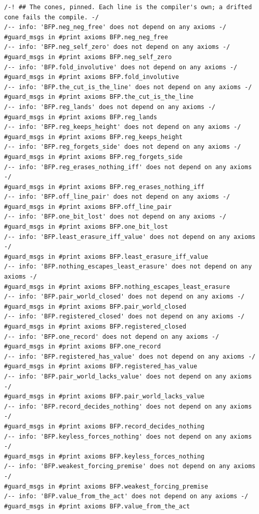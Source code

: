 \documentclass[10pt,twocolumn]{article}
\begin{document}
\begin{Verbatim}
/-! ## The cones, pinned. Each line is the compiler's own; a drifted cone fails the compile. -/
/-- info: 'BFP.neg_neg_free' does not depend on any axioms -/
#guard_msgs in #print axioms BFP.neg_neg_free
/-- info: 'BFP.neg_self_zero' does not depend on any axioms -/
#guard_msgs in #print axioms BFP.neg_self_zero
/-- info: 'BFP.fold_involutive' does not depend on any axioms -/
#guard_msgs in #print axioms BFP.fold_involutive
/-- info: 'BFP.the_cut_is_the_line' does not depend on any axioms -/
#guard_msgs in #print axioms BFP.the_cut_is_the_line
/-- info: 'BFP.reg_lands' does not depend on any axioms -/
#guard_msgs in #print axioms BFP.reg_lands
/-- info: 'BFP.reg_keeps_height' does not depend on any axioms -/
#guard_msgs in #print axioms BFP.reg_keeps_height
/-- info: 'BFP.reg_forgets_side' does not depend on any axioms -/
#guard_msgs in #print axioms BFP.reg_forgets_side
/-- info: 'BFP.reg_erases_nothing_iff' does not depend on any axioms -/
#guard_msgs in #print axioms BFP.reg_erases_nothing_iff
/-- info: 'BFP.off_line_pair' does not depend on any axioms -/
#guard_msgs in #print axioms BFP.off_line_pair
/-- info: 'BFP.one_bit_lost' does not depend on any axioms -/
#guard_msgs in #print axioms BFP.one_bit_lost
/-- info: 'BFP.least_erasure_iff_value' does not depend on any axioms -/
#guard_msgs in #print axioms BFP.least_erasure_iff_value
/-- info: 'BFP.nothing_escapes_least_erasure' does not depend on any axioms -/
#guard_msgs in #print axioms BFP.nothing_escapes_least_erasure
/-- info: 'BFP.pair_world_closed' does not depend on any axioms -/
#guard_msgs in #print axioms BFP.pair_world_closed
/-- info: 'BFP.registered_closed' does not depend on any axioms -/
#guard_msgs in #print axioms BFP.registered_closed
/-- info: 'BFP.one_record' does not depend on any axioms -/
#guard_msgs in #print axioms BFP.one_record
/-- info: 'BFP.registered_has_value' does not depend on any axioms -/
#guard_msgs in #print axioms BFP.registered_has_value
/-- info: 'BFP.pair_world_lacks_value' does not depend on any axioms -/
#guard_msgs in #print axioms BFP.pair_world_lacks_value
/-- info: 'BFP.record_decides_nothing' does not depend on any axioms -/
#guard_msgs in #print axioms BFP.record_decides_nothing
/-- info: 'BFP.keyless_forces_nothing' does not depend on any axioms -/
#guard_msgs in #print axioms BFP.keyless_forces_nothing
/-- info: 'BFP.weakest_forcing_premise' does not depend on any axioms -/
#guard_msgs in #print axioms BFP.weakest_forcing_premise
/-- info: 'BFP.value_from_the_act' does not depend on any axioms -/
#guard_msgs in #print axioms BFP.value_from_the_act

\end{Verbatim}
\end{document}

